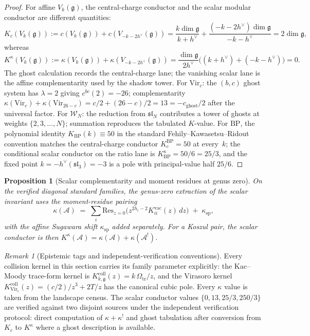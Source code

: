 \documentclass[11pt,reqno]{amsart}
\newtheorem{proposition}[theorem]{Proposition}
\theoremstyle{definition}
\theoremstyle{remark}
\newtheorem{remark}[theorem]{Remark}
\newcommand{\cA}{\mathcal{A}}
\newcommand{\cW}{\mathcal{W}}
\newcommand{\fg}{\mathfrak{g}}
\newcommand{\fsl}{\mathfrak{sl}}
\newcommand{\Res}{\mathrm{Res}}
\newcommand{\Vir}{\mathrm{Vir}}
\numberwithin{equation}{section}
\begin{document}
\begin{proof}
For affine $V_k(\fg)$, the central-charge conductor and the scalar
modular conductor are different quantities:
\[
K_c(V_k(\fg))
:=c(V_k(\fg))+c(V_{-k-2h^\vee}(\fg))
=\frac{k\dim\fg}{k+h^\vee}
+\frac{(-k-2h^\vee)\dim\fg}{-k-h^\vee}
=2\dim\fg,
\]
whereas
\[
K^\kappa(V_k(\fg))
:=\kappa(V_k(\fg))+\kappa(V_{-k-2h^\vee}(\fg))
=\frac{\dim\fg}{2h^\vee}\bigl((k+h^\vee)+(-k-h^\vee)\bigr)
=0.
\]
The ghost calculation records the central-charge lane; the
vanishing scalar lane is the affine complementarity used by the
shadow tower. For $\Vir_c$: the $(b,c)$ ghost system has
$\lambda = 2$ giving $c^{bc}(2) = -26$; complementarity
$\kappa(\Vir_c) + \kappa(\Vir_{26-c}) = c/2 + (26-c)/2 = 13 = -c_{\mathrm{ghost}}/2$
after the universal factor. For $\cW_N$: the reduction from
$\fsl_N$ contributes a tower of ghosts at weights
$\{2,3,\ldots,N\}$; summation reproduces the tabulated $K$-value.
For $\mathrm{BP}$, the
polynomial identity $K_{\mathrm{BP}}(k) \equiv 50$ in the standard
Fehily--Kawasetsu--Ridout convention matches the central-charge
conductor $K_c^{\mathrm{BP}}=50$ at every~$k$; the conditional scalar
conductor on the ratio lane is
$K^\kappa_{\mathrm{BP}}=50/6=25/3$, and the fixed point
$k = -h^\vee(\mathfrak{sl}_3) = -3$ is a pole with
principal-value half $25/6$.
\end{proof}

\begin{proposition}[Scalar complementarity and moment residues at genus zero]
\label{thm:moment-genus-zero}
On the verified diagonal standard families, the genus-zero extraction
of the scalar invariant uses the moment-residue pairing
\begin{equation}\label{eq:moment-g0}
\kappa(\cA)
\;=\;
\sum_i \Res_{z=0}\!\bigl(z^{2h_i-2}K^{\mathrm{vac}}_{ii}(z)\,dz\bigr)
\;+\;\kappa_{\mathrm{sp}},
\end{equation}
with the affine Sugawara shift $\kappa_{\mathrm{sp}}$ added
separately. For a Koszul pair, the scalar conductor is then
$K^\kappa(\cA)=\kappa(\cA)+\kappa(\cA^!)$.
\end{proposition}

\begin{remark}[Epistemic tags and independent-verification conventions]
\label{rem:conductor-epistemic}
Every collision kernel in this section carries its family parameter
explicitly: the Kac--Moody trace-form kernel is
$K_{k,\fg}^{\mathrm{coll}}(z)=k\,\Omega_{\mathrm{tr}}/z$, and the
Virasoro kernel
$K_{\Vir_c}^{\mathrm{coll}}(z)=(c/2)/z^3+2T/z$ has the canonical
cubic pole. Every $\kappa$ value is taken from the landscape census.
The scalar conductor values $\{0, 13, 25/3, 250/3\}$ are verified
against two disjoint sources under the independent verification
protocol: direct computation of $\kappa + \kappa^!$ and ghost
tabulation after conversion from $K_c$ to $K^\kappa$ where a ghost
description is available.
\end{remark}
\end{document}
